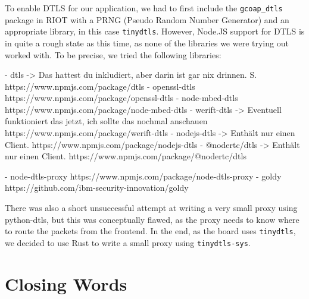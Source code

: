 \documentclass[10pt, a4paper]{article}
\begin{document}
    To enable DTLS for our application, we had to first include the \texttt{gcoap\_dtls} package in RIOT with a PRNG (Pseudo Random Number Generator) and an appropriate library, in this case \texttt{tinydtls}. However, Node.JS support for DTLS is in quite a rough state as this time, as none of the libraries we were trying out worked with. To be precise, we tried the following libraries:

    - dtls -> Das hattest du inkludiert, aber darin ist gar nix drinnen. S. https://www.npmjs.com/package/dtls
- openssl-dtls https://www.npmjs.com/package/openssl-dtls
- node-mbed-dtls https://www.npmjs.com/package/node-mbed-dtls
- werift-dtls -> Eventuell funktioniert das jetzt, ich sollte das nochmal anschauen https://www.npmjs.com/package/werift-dtls
- nodejs-dtls -> Enthält nur einen Client. https://www.npmjs.com/package/nodejs-dtls
- @nodertc/dtls -> Enthält nur einen Client. https://www.npmjs.com/package/@nodertc/dtls

    - node-dtls-proxy https://www.npmjs.com/package/node-dtls-proxy
- goldy https://github.com/ibm-security-innovation/goldy

    There was also a short unsuccessful attempt at writing a very small proxy using python-dtls, but this was conceptually flawed, as the proxy needs to know where to route the packets from the frontend. In the end, as the board uses \texttt{tinydtls}, we decided to use Rust to write a small proxy using \texttt{tinydtls-sys}.

    \section{Closing Words}

    \listoffigures
\end{document}
